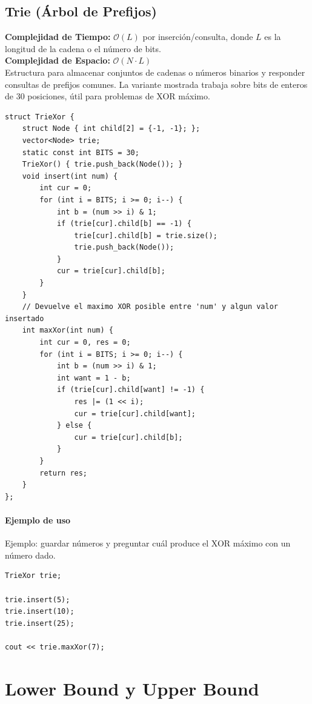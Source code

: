 \documentclass[10pt,twocolumn,letterpaper]{report}
\begin{document}
\section{Trie (Árbol de Prefijos)}
\textbf{Complejidad de Tiempo:} $\mathcal{O}(L)$ por inserción/consulta, donde $L$ es la longitud de la cadena o el número de bits. \\
\textbf{Complejidad de Espacio:} $\mathcal{O}(N \cdot L)$ \\
Estructura para almacenar conjuntos de cadenas o números binarios y responder consultas de prefijos comunes. La variante mostrada trabaja sobre bits de enteros de 30 posiciones, útil para problemas de XOR máximo.
\begin{lstlisting}
struct TrieXor {
    struct Node { int child[2] = {-1, -1}; };
    vector<Node> trie;
    static const int BITS = 30;
    TrieXor() { trie.push_back(Node()); }
    void insert(int num) {
        int cur = 0;
        for (int i = BITS; i >= 0; i--) {
            int b = (num >> i) & 1;
            if (trie[cur].child[b] == -1) {
                trie[cur].child[b] = trie.size();
                trie.push_back(Node());
            }
            cur = trie[cur].child[b];
        }
    }
    // Devuelve el maximo XOR posible entre 'num' y algun valor insertado
    int maxXor(int num) {
        int cur = 0, res = 0;
        for (int i = BITS; i >= 0; i--) {
            int b = (num >> i) & 1;
            int want = 1 - b;
            if (trie[cur].child[want] != -1) {
                res |= (1 << i);
                cur = trie[cur].child[want];
            } else {
                cur = trie[cur].child[b];
            }
        }
        return res;
    }
};
\end{lstlisting}
\subsubsection*{Ejemplo de uso}
Ejemplo: guardar números y preguntar cuál produce el XOR máximo con un número dado.
\begin{lstlisting}
TrieXor trie;

trie.insert(5);
trie.insert(10);
trie.insert(25);

cout << trie.maxXor(7);
\end{lstlisting}

\chapter{Lower Bound y Upper Bound}
\end{document}
